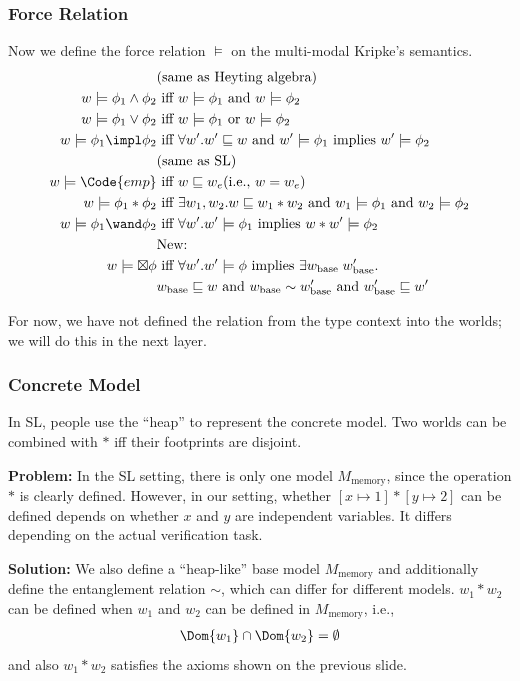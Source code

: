 \begin{frame}[fragile]
    \frametitle{Force Relation}
Now we define the force relation $\models$ on the multi-modal Kripke's semantics.
\begin{align*}
    &\text{(same as Heyting algebra)}
    \\w \models \phi_1 \land \phi_2 &\text{ iff } w \models \phi_1 \text{ and } w \models \phi_2
    \\w \models \phi_1 \lor \phi_2 &\text{ iff } w \models \phi_1 \text{ or } w \models \phi_2
    \\w \models \phi_1 \impl \phi_2 &\text{ iff } \forall w'. w' \sqsubseteq w \text{ and } w' \models \phi_1 \text{ implies } w' \models \phi_2
    \\&\text{(same as SL)}
    \\w \models \Code{emp} &\text{ iff } w \sqsubseteq w_e \text{(i.e., $w = w_e$)}
    \\w \models \phi_1 * \phi_2 &\text{ iff } \exists w_1, w_2. w \sqsubseteq w_1 * w_2 \text{ and } w_1 \models \phi_1 \text{ and } w_2 \models \phi_2
    \\w \models \phi_1 \wand \phi_2 &\text{ iff } \forall w'. w' \models \phi_1 \text{ implies } w * w' \models \phi_2
    \\&\text{New:}
    \\w \models \boxtimes \phi &\text{ iff } \forall w'. w' \models \phi \text{ implies } \exists w_\text{base}\;w_\text{base}'. 
    \\&w_\text{base} \sqsubseteq w \text{ and } w_\text{base} \sim w_\text{base}' \text{ and } w_\text{base}' \sqsubseteq w'
\end{align*}\noindent

For now, we have not defined the relation from the type context into the worlds; we will do this in the next layer.
\end{frame}

\begin{frame}[fragile]
    \frametitle{Concrete Model}
In SL, people use the ``heap'' to represent the concrete model. Two worlds can be combined with $*$ iff their footprints are disjoint.

\textbf{Problem:} In the SL setting, there is only one model $M_\text{memory}$, since the operation $*$ is clearly defined. However, in our setting, whether $[x \mapsto 1] * [y \mapsto 2]$ can be defined depends on whether $x$ and $y$ are independent variables. It differs depending on the actual verification task.

\textbf{Solution:} We also define a ``heap-like'' base model $M_\text{memory}$ and additionally define the entanglement relation $\sim$, which can differ for different models. $w_1 * w_2$ can be defined when $w_1$ and $w_2$ can be defined in $M_\text{memory}$, i.e.,
\begin{align*}
    \Dom{w_1} \cap \Dom{w_2} = \emptyset
\end{align*}\noindent
and also $w_1 * w_2$ satisfies the axioms shown on the previous slide.

\end{frame}

